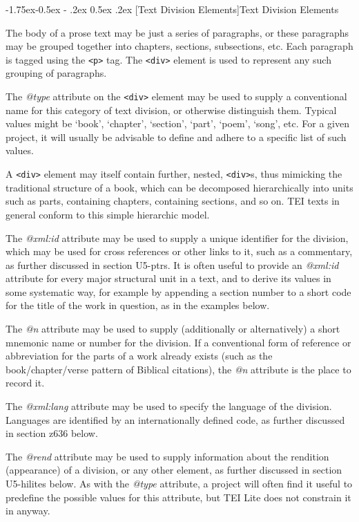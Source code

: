 \documentclass[11pt,twoside]{article}\makeatletter
\makeatletter
\renewcommand\subsection{\@startsection{subsection}{2}{\z@}%
     {-1.75ex\@plus -0.5ex \@minus- .2ex}%
     {0.5ex \@plus .2ex}%
     {\reset@font\Large\sffamily}}
\makeatother
\begin{document}
\subsection[{Text Division Elements}]{Text Division Elements}\label{divs}\par
The body of a prose text may be just a series of paragraphs, or these paragraphs may be grouped together into chapters, sections, subsections, etc. Each paragraph is tagged using the \texttt{<p>} tag. The \texttt{<div>} element is used to represent any such grouping of paragraphs. \par
The \textit{@type} attribute on the \texttt{<div>} element may be used to supply a conventional name for this category of text division, or otherwise distinguish them. Typical values might be ‘book’, ‘chapter’, ‘section’, ‘part’, ‘poem’, ‘song’, etc. For a given project, it will usually be advisable to define and adhere to a specific list of such values.\par
A \texttt{<div>} element may itself contain further, nested, \texttt{<div>}s, thus mimicking the traditional structure of a book, which can be decomposed hierarchically into units such as parts, containing chapters, containing sections, and so on. TEI texts in general conform to this simple hierarchic model.\par
The \textit{@xml:id} attribute may be used to supply a unique identifier for the division, which may be used for cross references or other links to it, such as a commentary, as further discussed in section U5-ptrs. It is often useful to provide an \textit{@xml:id} attribute for every major structural unit in a text, and to derive its values in some systematic way, for example by appending a section number to a short code for the title of the work in question, as in the examples below.\par
The \textit{@n} attribute may be used to supply (additionally or alternatively) a short mnemonic name or number for the division. If a conventional form of reference or abbreviation for the parts of a work already exists (such as the book/chapter/verse pattern of Biblical citations), the \textit{@n} attribute is the place to record it.\par
The \textit{@xml:lang} attribute may be used to specify the language of the division. Languages are identified by an internationally defined code, as further discussed in section z636 below.\par
The \textit{@rend} attribute may be used to supply information about the rendition (appearance) of a division, or any other element, as further discussed in section U5-hilites below. As with the \textit{@type} attribute, a project will often find it useful to predefine the possible values for this attribute, but TEI Lite does not constrain it in anyway.\par
\end{document}
